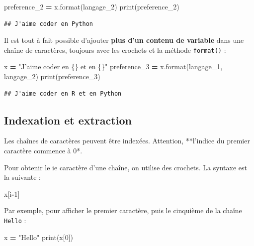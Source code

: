 \documentclass[12pt,]{book}
\newenvironment{Shaded}{\begin{snugshade}}{\end{snugshade}}
\newcommand{\DecValTok}[1]{\textcolor[rgb]{0.00,0.00,0.81}{#1}}
\newcommand{\SpecialCharTok}[1]{\textcolor[rgb]{0.00,0.00,0.00}{#1}}
\newcommand{\StringTok}[1]{\textcolor[rgb]{0.31,0.60,0.02}{#1}}
\newcommand{\OperatorTok}[1]{\textcolor[rgb]{0.81,0.36,0.00}{\textbf{#1}}}
\newcommand{\BuiltInTok}[1]{#1}
\newcommand{\NormalTok}[1]{#1}
\numberwithin{equation}{section}
\numberwithin{countremarque}{section}
\begin{document}
\begin{Shaded}
\begin{Highlighting}[]
\NormalTok{preference_2 }\OperatorTok{=}\NormalTok{ x.}\BuiltInTok{format}\NormalTok{(langage_2)}
\BuiltInTok{print}\NormalTok{(preference_2)}
\end{Highlighting}
\end{Shaded}

\begin{lstlisting}
## J'aime coder en Python
\end{lstlisting}

Il est tout à fait possible d'ajouter \textbf{plus d'un contenu de
variable} dans une chaîne de caractères, toujours avec les crochets et
la méthode \texttt{format()} :

\begin{Shaded}
\begin{Highlighting}[]
\NormalTok{x }\OperatorTok{=} \StringTok{"J'aime coder en }\SpecialCharTok{\{\}}\StringTok{ et en }\SpecialCharTok{\{\}}\StringTok{"}
\NormalTok{preference_3 }\OperatorTok{=}\NormalTok{ x.}\BuiltInTok{format}\NormalTok{(langage_1, langage_2)}
\BuiltInTok{print}\NormalTok{(preference_3)}
\end{Highlighting}
\end{Shaded}

\begin{lstlisting}
## J'aime coder en R et en Python
\end{lstlisting}

\subsection{Indexation et extraction}\label{indexation-et-extraction}

Les chaînes de caractères peuvent être indexées. Attention, **l'indice
du premier caractère commence à 0*.

Pour obtenir le ie caractère d'une chaîne, on utilise des crochets. La
syntaxe est la suivante :

\begin{Shaded}
\begin{Highlighting}[]
\NormalTok{x[i}\OperatorTok{-}\DecValTok{1}\NormalTok{]}
\end{Highlighting}
\end{Shaded}

Par exemple, pour afficher le premier caractère, puis le cinquième de la
chaîne \texttt{Hello} :

\begin{Shaded}
\begin{Highlighting}[]
\NormalTok{x }\OperatorTok{=} \StringTok{"Hello"}
\BuiltInTok{print}\NormalTok{(x[}\DecValTok{0}\NormalTok{])}
\end{Highlighting}
\end{Shaded}
\end{document}
